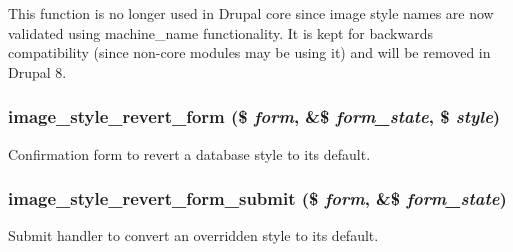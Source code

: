 This function is no longer used in Drupal core since image style names are now validated using machine\_\-name functionality. It is kept for backwards compatibility (since non-\/core modules may be using it) and will be removed in Drupal 8. \hypertarget{image_8admin_8inc_a9a62c6df953ab02bc518b51b1fda7b1c}{
\subsubsection[{image\_\-style\_\-revert\_\-form}]{\setlength{\rightskip}{0pt plus 5cm}image\_\-style\_\-revert\_\-form (\$ {\em form}, \/  \&\$ {\em form\_\-state}, \/  \$ {\em style})}}
\label{image_8admin_8inc_a9a62c6df953ab02bc518b51b1fda7b1c}
Confirmation form to revert a database style to its default. \hypertarget{image_8admin_8inc_a359100e93b8033e1bad0ceb548b599c0}{
\subsubsection[{image\_\-style\_\-revert\_\-form\_\-submit}]{\setlength{\rightskip}{0pt plus 5cm}image\_\-style\_\-revert\_\-form\_\-submit (\$ {\em form}, \/  \&\$ {\em form\_\-state})}}
\label{image_8admin_8inc_a359100e93b8033e1bad0ceb548b599c0}
Submit handler to convert an overridden style to its default. 